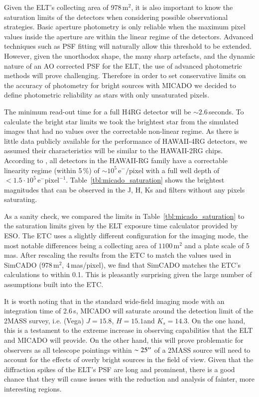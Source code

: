 Given the ELT's collecting area of 978\,m$^2$, it is also important to know the saturation limits of the detectors when considering possible observational strategies. Basic aperture photometry is only reliable when the maximum pixel values inside the aperture are within the linear regime of the detectors. Advanced techniques such as PSF fitting will naturally allow this threshold to be extended. However, given the unorthodox shape, the many sharp artefacts, and the dynamic nature of an AO corrected PSF for the ELT, the use of advanced photometric methods will prove challenging. Therefore in order to set conservative limits on the accuracy of photometry for bright sources with MICADO we decided to define photometric reliability as stars with only unsaturated pixels.

The minimum read-out time for a full H4RG detector will be $\sim 2.6$\,seconds.
To calculate the bright star limits we took the brightest star from the simulated images that had no values over the correctable non-linear regime. As there is little data publicly available for the performance of HAWAII-4RG detectors, we assumed their characteristics will be similar to the HAWAII-2RG chips. According to \citet{hawaii2rg}, all detectors in the HAWAII-RG family have a correctable linearity regime (within 5\,\%) of $\sim 10^{5}\,\mathrm{e}^{-}/\mathrm{pixel}$ with a full well depth of $<1.5 \cdot 10^{5}\,\mathrm{e}^{-}\mathrm{pixel}^{-1}$. Table~\ref{tbl:micado_saturation} shows the brightest magnitudes that can be observed in the J, H, Ks and \brgamma filters without any pixels saturating. 

As a sanity check, we compared the limits in Table~\ref{tbl:micado_saturation} to the saturation limits given by the ELT exposure time calculator provided by ESO. The ETC uses a slightly different configuration for the imaging mode, the most notable differences being a collecting area of $1100\,\mathrm{m^2}$ and a plate scale of 5\,mas. After rescaling the results from the ETC to match the values used in SimCADO (978\,m$^2$, 4\,mas/pixel), we find that SimCADO matches the ETC's calculations to within 0.1\m. This is pleasantly surprising given the large number of assumptions built into the ETC.

It is worth noting that in the standard wide-field imaging mode with an integration time of 2.6\,s, MICADO will saturate around the detection limit of the 2MASS survey, i.e. (Vega) $J=15.8$\m, $H=15.1$\m and $K_{s}=14.3$\m \citep{2mass}. On the one hand, this is a testament to the extreme increase in observing capabilities that the ELT and MICADO will provide. On the other hand, this will prove problematic for observers as all telescope pointings within $\sim 25^{\prime\prime}$ of a 2MASS source will need to account for the effects of overly bright sources in the field of view. Given that the diffraction spikes of the ELT's PSF are long and prominent, there is a good chance that they will cause issues with the reduction and analysis of fainter, more interesting regions. 


